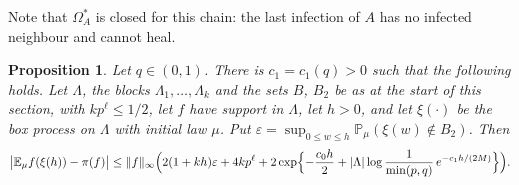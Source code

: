 \documentclass[11pt]{amsart}
\newtheorem{proposition}[theorem]{Proposition}
\theoremstyle{definition}
\theoremstyle{remark}
\newcommand{\PP}{\mathbb{P}}
\newcommand{\E}{\mathbb{E}}
\begin{document}
Note that $\Omega_A^*$ is closed for this chain: the last infection of $A$ has no infected neighbour and cannot heal.

\begin{proposition}\label{prop:box}
Let $q\in(0,1)$. There is $c_1=c_1(q)>0$ such that the following holds. Let $\Lambda$, the blocks $\Lambda_1,\dots,\Lambda_k$ and the sets $B$, $B_2$ be as at the start of this section, with
$kp^\ell\le1/2$, let $f$ have support in $\Lambda$, let $h>0$, and let $\xi(\cdot)$ be the box process on $\Lambda$ with
initial law $\mu$. Put $\varepsilon=\sup_{0\le w\le h}\PP_\mu(\xi(w)\notin B_2)$. Then
\[
\bigl|\E_\mu f(\xi(h))-\pi(f)\bigr|\le\|f\|_\infty\Bigl(2(1+kh)\varepsilon+4kp^\ell+
2\exp\Bigl\{-\frac{c_0h}2+|\Lambda|\log\frac1{\min(p,q)}\,e^{-c_1h/(2M)}\Bigr\}\Bigr).
\]
\end{proposition}
\end{document}
